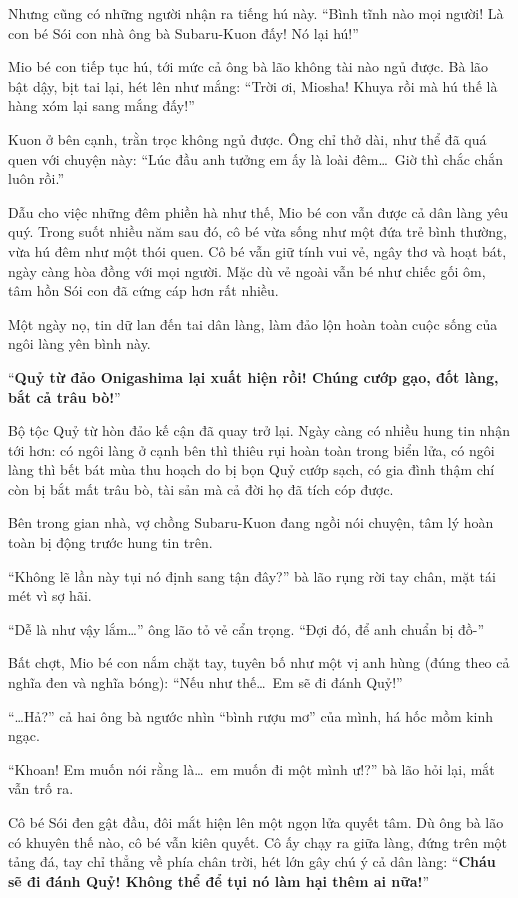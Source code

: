 \documentclass[../main.tex]{subfiles}
\begin{document}
Nhưng cũng có những người nhận ra tiếng hú này. ``Bình tĩnh nào mọi người! Là con bé Sói con nhà ông bà Subaru-Kuon đấy! Nó lại hú!''

Mio bé con tiếp tục hú, tới mức cả ông bà lão không tài nào ngủ được. Bà lão bật dậy, bịt tai lại, hét lên như mắng: ``Trời ơi, Miosha! Khuya rồi mà hú thế là hàng xóm lại sang mắng đấy!''

Kuon ở bên cạnh, trằn trọc không ngủ được. Ông chỉ thở dài, như thể đã quá quen với chuyện này: ``Lúc đầu anh tưởng em ấy là loài đêm\dots\ Giờ thì chắc chắn luôn rồi.''

Dẫu cho việc những đêm phiền hà như thế, Mio bé con vẫn được cả dân làng yêu quý. Trong suốt nhiều năm sau đó, cô bé vừa sống như một đứa trẻ bình thường, vừa hú đêm như một thói quen. Cô bé vẫn giữ tính vui vẻ, ngây thơ và hoạt bát, ngày càng hòa đồng với mọi người. Mặc dù vẻ ngoài vẫn bé như chiếc gối ôm, tâm hồn Sói con đã cứng cáp hơn rất nhiều.

Một ngày nọ, tin dữ lan đến tai dân làng, làm đảo lộn hoàn toàn cuộc sống của ngôi làng yên bình này.

``\textbf{Quỷ từ đảo Onigashima lại xuất hiện rồi! Chúng cướp gạo, đốt làng, bắt cả trâu bò!}''

Bộ tộc Quỷ từ hòn đảo kế cận đã quay trở lại. Ngày càng có nhiều hung tin nhận tới hơn: có ngôi làng ở cạnh bên thì thiêu rụi hoàn toàn trong biển lửa, có ngôi làng thì bết bát mùa thu hoạch do bị bọn Quỷ cướp sạch, có gia đình thậm chí còn bị bắt mất trâu bò, tài sản mà cả đời họ đã tích cóp được.

Bên trong gian nhà, vợ chồng Subaru-Kuon đang ngồi nói chuyện, tâm lý hoàn toàn bị động trước hung tin trên.

``Không lẽ lần này tụi nó định sang tận đây?'' bà lão rụng rời tay chân, mặt tái mét vì sợ hãi.

``Dễ là như vậy lắm\dots'' ông lão tỏ vẻ cẩn trọng. ``Đợi đó, để anh chuẩn bị đồ-''

Bất chợt, Mio bé con nắm chặt tay, tuyên bố như một vị anh hùng (đúng theo cả nghĩa đen và nghĩa bóng): ``Nếu như thế\dots\ Em sẽ đi đánh Quỷ!''

``\dots Hả?'' cả hai ông bà ngước nhìn ``bình rượu mơ'' của mình, há hốc mồm kinh ngạc.

``Khoan! Em muốn nói rằng là\dots\ em muốn đi một mình ư!?'' bà lão hỏi lại, mắt vẫn trố ra.

Cô bé Sói đen gật đầu, đôi mắt hiện lên một ngọn lửa quyết tâm. Dù ông bà lão có khuyên thế nào, cô bé vẫn kiên quyết. Cô ấy chạy ra giữa làng, đứng trên một tảng đá, tay chỉ thẳng về phía chân trời, hét lớn gây chú ý cả dân làng: ``\textbf{Cháu sẽ đi đánh Quỷ! Không thể để tụi nó làm hại thêm ai nữa!}''
\end{document}

